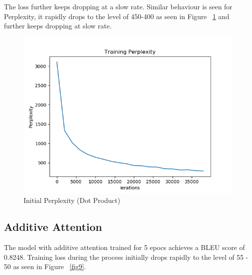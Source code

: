 \documentclass[11pt,a4paper]{article}
\begin{document}
The loss further keeps dropping at a slow rate. Similar behaviour is seen for Perplexity, it rapidly drops to the level of 450-400 as seen in Figure ~\ref{fig7} and further keeps dropping at slow rate.



\begin{figure}[!htbp]
\includegraphics[width=\linewidth]{hi_dot_ppl_1.png}
\caption{Initial Perplexity (Dot Product)}
\label{fig7}
\end{figure}



\subsection{Additive Attention}

The model with additive attention trained for 5 epocs achieves a BLEU score of 0.8248.
Training loss during the process initially drops rapidly to the level of 55 - 50 as seen in Figure ~\ref{fig9}. 
\end{document}

